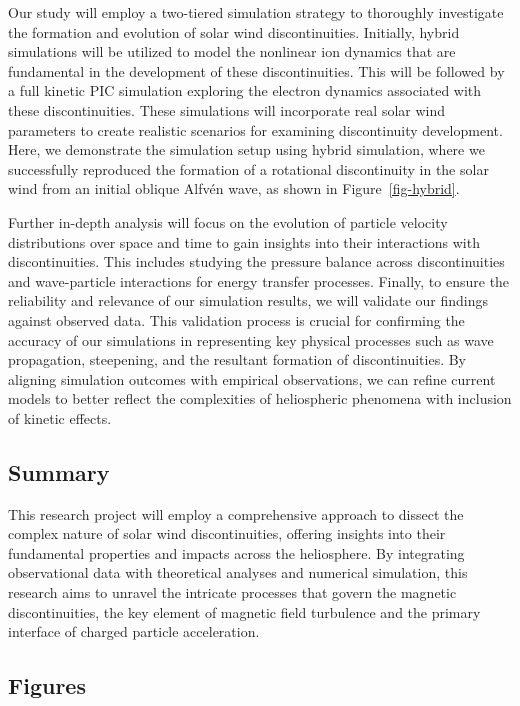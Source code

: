 \documentclass[
  letterpaper,
  DIV=11,
  numbers=noendperiod]{scrartcl}
\begin{document}
Our study will employ a two-tiered simulation strategy to thoroughly investigate the formation and evolution of solar wind discontinuities. Initially, hybrid simulations will be utilized to model the nonlinear ion dynamics that are fundamental in the development of these discontinuities. This will be followed by a full kinetic PIC simulation exploring the electron dynamics associated with these discontinuities. These simulations will incorporate real solar wind parameters to create realistic scenarios for examining discontinuity development. Here, we demonstrate the simulation setup using hybrid simulation, where we successfully reproduced the formation of a rotational discontinuity in the solar wind from an initial oblique Alfvén wave, as shown in Figure~\ref{fig-hybrid}.

Further in-depth analysis will focus on the evolution of particle velocity distributions over space and time to gain insights into their interactions with discontinuities. This includes studying the pressure balance across discontinuities and wave-particle interactions for energy transfer processes. Finally, to ensure the reliability and relevance of our simulation results, we will validate our findings against observed data. This validation process is crucial for confirming the accuracy of our simulations in representing key physical processes such as wave propagation, steepening, and the resultant formation of discontinuities. By aligning simulation outcomes with empirical observations, we can refine current models to better reflect the complexities of heliospheric phenomena with inclusion of kinetic effects.

\subsection{Summary}\label{summary}

This research project will employ a comprehensive approach to dissect the complex nature of solar wind discontinuities, offering insights into their fundamental properties and impacts across the heliosphere. By integrating observational data with theoretical analyses and numerical simulation, this research aims to unravel the intricate processes that govern the magnetic discontinuities, the key element of magnetic field turbulence and the primary interface of charged particle acceleration.

\subsection{Figures}\label{figures}
\end{document}
